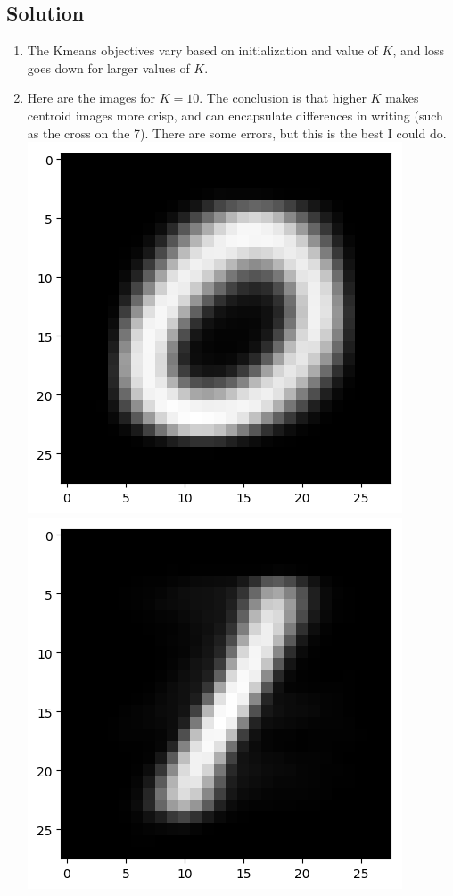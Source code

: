 \documentclass[submit]{harvardml}
\begin{document}
\subsection*{Solution}
\begin{enumerate}
    \item
        The Kmeans objectives vary based on initialization and value of $K$,
        and loss goes down for larger values of $K$.
    \item
        Here are the images for $K = 10$. The conclusion is that higher $K$
        makes centroid images more crisp, and can encapsulate differences in
        writing (such as the cross on the 7). There are some errors, but this
        is the best I could do. \\
        \includegraphics[scale=0.3]{figures/k3_centroids/9.png} \\
        \includegraphics[scale=0.3]{figures/k3_centroids/2.png} \\

\end{enumerate}
\end{document}
